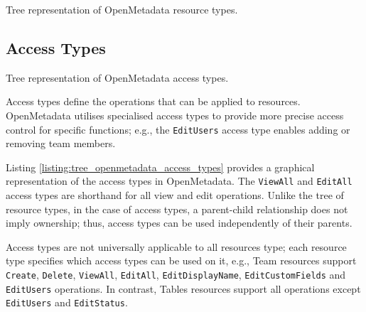 \begin{listing}
    \caption{Tree representation of OpenMetadata resource types.}
    \label{listing:tree_openmetadata_resources}
    
\end{listing}

\subsection{Access Types}

\begin{listing}[!htb]

    \renewcommand\DTstyle{\rmfamily}

    \caption{Tree representation of OpenMetadata access types.}
    \label{listing:tree_openmetadata_access_types}
    
\end{listing}


Access types define the operations that can be applied to resources. OpenMetadata utilises specialised access types to provide more precise access control for specific functions; e.g., the \texttt{EditUsers} access type enables adding or removing team members. 

Listing \ref{listing:tree_openmetadata_access_types} provides a graphical representation of the access types in OpenMetadata. The \texttt{ViewAll} and \texttt{EditAll} access types are shorthand for all view and edit operations. Unlike the tree of resource types, in the case of access types, a parent-child relationship does not imply ownership; thus, access types can be used independently of their parents.

Access types are not universally applicable to all resources type; each resource type specifies which access types can be used on it, e.g., Team resources support \texttt{Create}, \texttt{Delete}, \texttt{ViewAll}, \texttt{EditAll}, \texttt{EditDisplayName}, \texttt{EditCustomFields} and \texttt{EditUsers} operations. In contrast, Tables resources support all operations except \texttt{EditUsers} and \texttt{EditStatus}.

